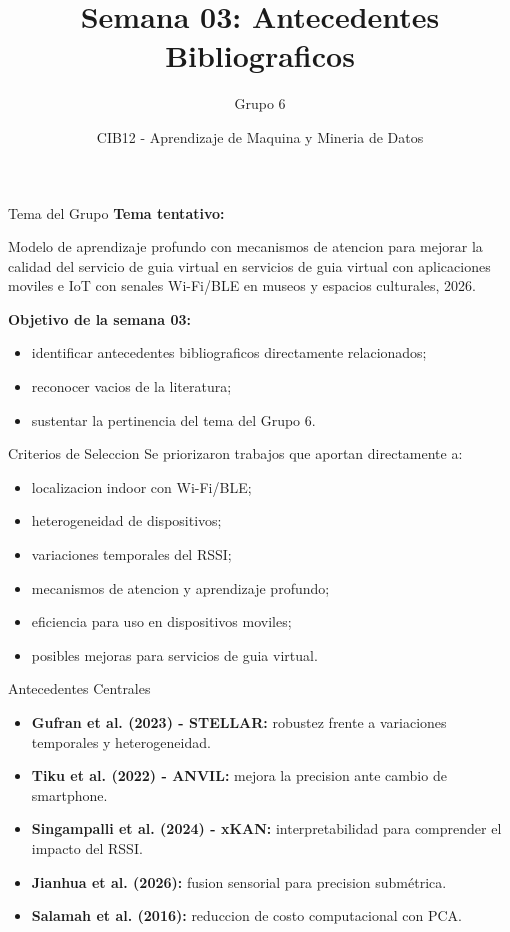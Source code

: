 \documentclass[aspectratio=169,11pt]{beamer}
\title{Semana 03: Antecedentes Bibliograficos}
\author{Grupo 6}
\date{CIB12 - Aprendizaje de Maquina y Mineria de Datos}
\begin{document}
\begin{frame}
  \titlepage
\end{frame}

\begin{frame}{Tema del Grupo}
\justifying
\textbf{Tema tentativo:}

\vspace{0.5em}

Modelo de aprendizaje profundo con mecanismos de atencion para mejorar la calidad del servicio de guia virtual en servicios de guia virtual con aplicaciones moviles e IoT con senales Wi-Fi/BLE en museos y espacios culturales, 2026.

\vspace{0.8em}

\textbf{Objetivo de la semana 03:}
\begin{itemize}
  \item identificar antecedentes bibliograficos directamente relacionados;
  \item reconocer vacios de la literatura;
  \item sustentar la pertinencia del tema del Grupo 6.
\end{itemize}
\end{frame}

\begin{frame}{Criterios de Seleccion}
\justifying
Se priorizaron trabajos que aportan directamente a:
\begin{itemize}
  \item localizacion indoor con Wi-Fi/BLE;
  \item heterogeneidad de dispositivos;
  \item variaciones temporales del RSSI;
  \item mecanismos de atencion y aprendizaje profundo;
  \item eficiencia para uso en dispositivos moviles;
  \item posibles mejoras para servicios de guia virtual.
\end{itemize}
\end{frame}

\begin{frame}{Antecedentes Centrales}
\justifying
\begin{itemize}
  \item \textbf{Gufran et al. (2023) - STELLAR:} robustez frente a variaciones temporales y heterogeneidad.
  \item \textbf{Tiku et al. (2022) - ANVIL:} mejora la precision ante cambio de smartphone.
  \item \textbf{Singampalli et al. (2024) - xKAN:} interpretabilidad para comprender el impacto del RSSI.
  \item \textbf{Jianhua et al. (2026):} fusion sensorial para precision submétrica.
  \item \textbf{Salamah et al. (2016):} reduccion de costo computacional con PCA.
\end{itemize}
\end{frame}
\end{document}

